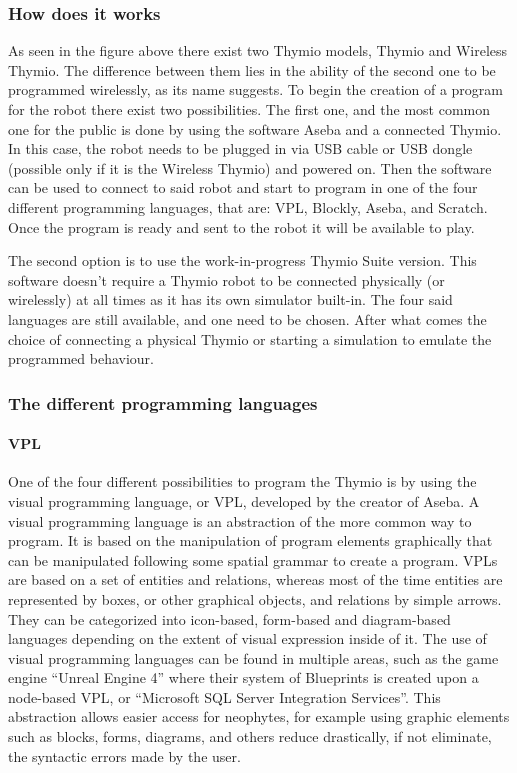 \documentclass{scrartcl}
\begin{document}
\subsubsection{How does it works}

As seen in the figure above there exist two Thymio models, Thymio and Wireless Thymio. 
The difference between them lies in the ability of the second one to be programmed wirelessly, 
as its name suggests. To begin the creation of a program for the robot there exist two possibilities.
The first one, and the most common one for the public is done by using the software Aseba and a connected Thymio. 
In this case, the robot needs to be plugged in via USB cable or USB dongle (possible only if it is the Wireless Thymio) and powered on. 
Then the software can be used to connect to said robot and start to program in one of the four different programming languages, 
that are: VPL, Blockly, Aseba, and Scratch. Once the program is ready and sent to the robot it will be available to play.

The second option is to use the work-in-progress Thymio Suite version. 
This software doesn’t require a Thymio robot to be connected physically (or wirelessly) at all times as it has its own simulator built-in. 
The four said languages are still available, and one need to be chosen. 
After what comes the choice of connecting a physical Thymio or starting a simulation to emulate the programmed behaviour.

\subsubsection{The different programming languages}
\paragraph{VPL}

One of the four different possibilities to program the Thymio is by using the visual programming language, or VPL, 
developed by the creator of Aseba. A visual programming language is an abstraction of the more common way to program. 
It is based on the manipulation of program elements graphically that can be manipulated following some spatial grammar to create a program. 
VPLs are based on a set of entities and relations, whereas most of the time entities are represented by boxes, 
or other graphical objects, and relations by simple arrows. They can be categorized into icon-based, 
form-based and diagram-based languages depending on the extent of visual expression inside of it. 
The use of visual programming languages can be found in multiple areas, such as the game engine “Unreal Engine 4” where their system of Blueprints is created upon a node-based VPL, 
or “Microsoft SQL Server Integration Services”. This abstraction allows easier access for neophytes, 
for example using graphic elements such as blocks, forms, diagrams, and others reduce drastically, if not eliminate, the syntactic errors made by the user.
\end{document}
